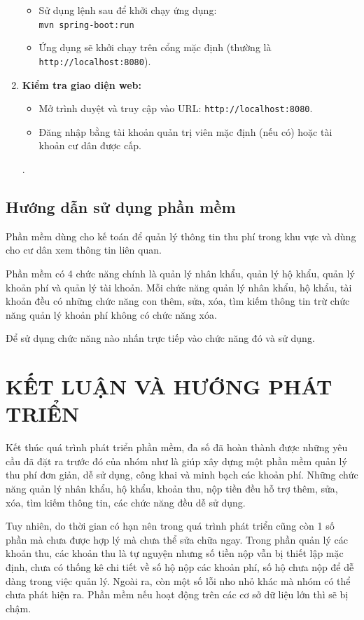 \documentclass{article}
\begin{document}
\begin{enumerate}
    \begin{itemize}
        \item Sử dụng lệnh sau để khởi chạy ứng dụng:\\\verb|mvn spring-boot:run |
        \item Ứng dụng sẽ khởi chạy trên cổng mặc định (thường là \verb|http://localhost:8080|).
    \end{itemize}
    \item \textbf{Kiểm tra giao diện web:}
    \begin{itemize}
        \item Mở trình duyệt và truy cập vào URL: \verb|http://localhost:8080|.
        \item Đăng nhập bằng tài khoản quản trị viên mặc định (nếu có) hoặc tài khoản cư dân được cấp.
    \end{itemize}.
\end{enumerate}
\subsection{Hướng dẫn sử dụng phần mềm}
Phần mềm dùng cho kế toán để quản lý thông tin thu phí trong khu vực và dùng cho cư dân xem thông tin liên quan.

Phần mềm có 4 chức năng chính là quản lý nhân khẩu, quản lý hộ khẩu, quản lý khoản phí và quản lý tài khoản. Mỗi chức năng quản lý nhân khẩu, hộ khẩu, tài khoản đều có những chức năng con thêm, sửa, xóa, tìm kiếm thông tin trừ chức năng quản lý khoản phí không có chức năng xóa.

Để sử dụng chức năng nào nhấn trực tiếp vào chức năng đó và sử dụng.
\newpage

\section*{KẾT LUẬN VÀ HƯỚNG PHÁT TRIỂN}
Kết thúc quá trình phát triển phần mềm, đa số đã hoàn thành được những yêu cầu đã đặt ra trước đó của nhóm như là giúp xây dựng một phần mềm quản lý thu phí đơn giản, dễ sử dụng, công khai và minh bạch các khoản phí. Những chức năng quản lý nhân khẩu, hộ khẩu, khoản thu, nộp tiền đều hỗ trợ thêm, sửa, xóa, tìm kiếm thông tin, các chức năng đều dễ sử dụng.

Tuy nhiên, do thời gian có hạn nên trong quá trình phát triển cũng còn 1 số phần mà chưa được hợp lý mà chưa thể sửa chữa ngay. Trong phần quản lý các khoản thu, các khoản thu là tự nguyện nhưng số tiền nộp vẫn bị thiết lập mặc định, chưa có thống kê chi tiết về số hộ nộp các khoản phí, số hộ chưa nộp để dễ dàng trong việc quản lý. Ngoài ra, còn một số lỗi nho nhỏ khác mà nhóm có thể chưa phát hiện ra.
Phần mềm nếu hoạt động trên các cơ sở dữ liệu lớn thì sẽ bị chậm.
\end{document}
